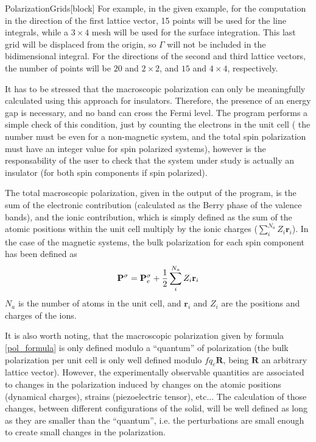 \begin{fdfentry}{PolarizationGrids}[block]
  For example, in the given example, for the computation in the
  direction of the first lattice vector, 15 points will be used for
  the line integrals, while a $3\times4$ mesh will be used for the
  surface integration. This last grid will be displaced from the
  origin, so $\Gamma$ will not be included in the bidimensional
  integral. For the directions of the second and third lattice
  vectors, the number of points will be $20$ and $2\times2$, and $15$
  and $4\times4$, respectively.

  It has to be stressed that the macroscopic polarization can only be
  meaningfully calculated using this approach for insulators.
  Therefore, the presence of an energy gap is necessary, and no band
  can cross the Fermi level. The program performs a simple check of
  this condition, just by counting the electrons in the unit cell (
  the number must be even for a non-magnetic system, and the total
  spin polarization must have an integer value for spin polarized
  systems), however is the responsability of the user to check that
  the system under study is actually an insulator (for both spin
  components if spin polarized).

  The total macroscopic polarization, given in the output of the
  program, is the sum of the electronic contribution (calculated as
  the Berry phase of the valence bands), and the ionic contribution,
  which is simply defined as the sum of the atomic positions within
  the unit cell multiply by the ionic charges
  ($\sum_i^{N_a} Z_i \mathbf{r}_i$).  In the case of the magnetic
  systems, the bulk polarization for each spin component has been
  defined as
  \begin{equation}
    \mathbf{P}^\sigma = \mathbf{P}_e^\sigma +
    {1 \over 2} \sum_i^{N_a}  Z_i \mathbf{r}_i
  \end{equation}
  $N_a$ is the number of atoms in the unit cell, and $\mathbf{r}_i$
  and $Z_i$ are the positions and charges of the ions.

  It is also worth noting, that the macroscopic polarization given by
  formula \eqref{pol_formula} is only defined modulo a ``quantum'' of
  polarization (the bulk polarization per unit cell is only well
  defined modulo $fq_e\mathbf{R}$, being $\mathbf{R}$ an arbitrary
  lattice vector). However, the experimentally observable quantities
  are associated to changes in the polarization induced by changes on
  the atomic positions (dynamical charges), strains (piezoelectric
  tensor), etc... The calculation of those changes, between different
  configurations of the solid, will be well defined as long as they
  are smaller than the ``quantum'', i.e. the perturbations are small
  enough to create small changes in the polarization.

\end{fdfentry}

